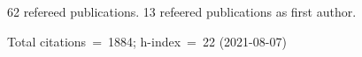 62 refereed publications. 13 refeered publications as first author.

Total citations~=~1884; h-index~=~22 (2021-08-07)